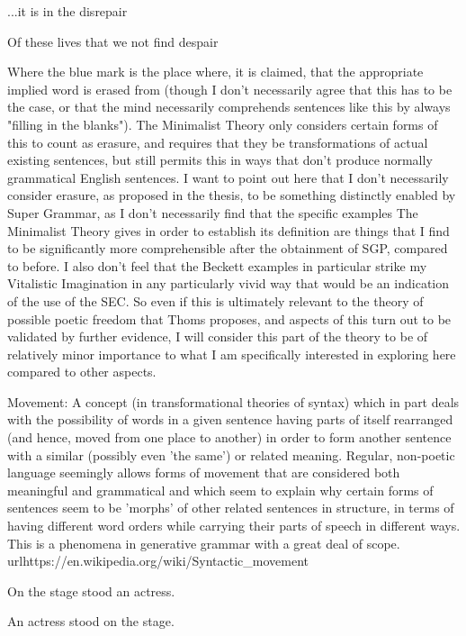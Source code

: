 \documentclass[]{article}
\begin{document}
...it is in the disrepair

Of these lives that we     not find despair



Where the blue mark is the place where, it is claimed, that the appropriate implied word is erased from (though I don't necessarily agree that this has to be the case, or that the mind necessarily comprehends sentences like this by always "filling in the blanks"). The Minimalist Theory only considers certain forms of this to count as erasure, and requires that they be transformations of actual existing sentences, but still permits this in ways that don't produce normally grammatical English sentences. I want to point out here that I don't necessarily consider erasure, as proposed in the thesis, to be something distinctly enabled by Super Grammar, as I don't necessarily find that the specific examples The Minimalist Theory gives in order to establish its definition are things that I find to be significantly more comprehensible after the obtainment of SGP, compared to before. I also don't feel that the Beckett examples in particular strike my Vitalistic Imagination in any particularly vivid way that would be an indication of the use of the SEC. So even if this is ultimately relevant to the theory of possible poetic freedom that Thoms proposes, and aspects of this turn out to be validated by further evidence, I will consider this part of the theory to be of relatively minor importance to what I am specifically interested in exploring here compared to other aspects.



Movement: A concept  (in transformational theories of syntax) which in part deals with the possibility of words in a given sentence having parts of itself rearranged (and hence, moved from one place to another) in order to form another sentence with a similar (possibly even 'the same') or related meaning. Regular, non-poetic language seemingly allows forms of movement that are considered both meaningful and grammatical and which seem to explain why certain forms of sentences seem to be 'morphs' of other related sentences in structure, in terms of having different word orders while carrying their parts of speech in different ways. This is a phenomena in generative grammar with a great deal of scope. url{https://en.wikipedia.org/wiki/Syntactic_movement}



On the stage stood an actress.

An actress stood on the stage.
\end{document}
